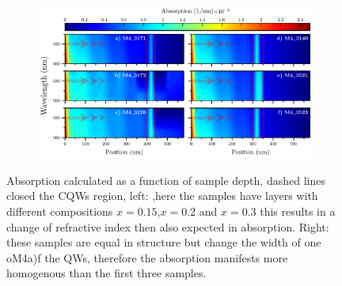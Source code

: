 \begin{figure}[hbt!]
	\centering
	\begin{subfigure}{\textwidth}
		\includegraphics[width=\textwidth]{../figures/chapter-3/absorption-simulations/build/abs-calcs.pdf}
		\label{subfig:chapter-3-Absorption-M4_3171-a)}
		\label{subfig:chapter-3-Absorption-M4_3172-b)}
		\label{subfig:chapter-3-Absorption-M4_3226-c)}
		\label{subfig:chapter-3-Absorption-M4_3140-d)}
		\label{subfig:chapter-3-Absorption-M4_3521-e)}
		\label{subfig:chapter-3-Absorption-M4_3523-f)}
	\end{subfigure}
	\caption{Absorption calculated as a function of sample depth, dashed lines closed the CQWs region, left: ,here the samples have \algaas layers with different compositions $x=0.15$,$x=0.2$ and $x=0.3$ this results in a change of refractive index then also expected in absorption.  Right:    these samples are equal in structure but change the width of one oM4a)f the QWs, therefore the absorption manifests more homogenous than the first three samples. 
	}
	\label{fig:chapter-3-PL-Absorption-Calcs}
\end{figure}

